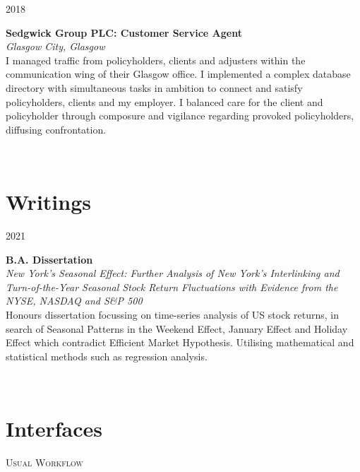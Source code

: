 \documentclass[a4, 10pt]{article}
\begin{document}
{\begin{minipage}[t]{.15\linewidth}
        \hfill    
        \textsc{2018}
\end{minipage}                    
\hfill\vline\hfill                
\begin{minipage}[t]{.80\linewidth}                
        \textbf{Sedgwick Group PLC: Customer Service Agent }\\ 
        \textit{Glasgow City, Glasgow}\\    
	I managed traffic from policyholders, clients and adjusters within the communication wing of their Glasgow office. I implemented a complex database directory with simultaneous tasks in ambition to connect and satisfy policyholders, clients and my employer. I balanced care for the client and policyholder through composure and vigilance regarding provoked policyholders, diffusing confrontation.
\end{minipage}\\
\vspace{0.25cm}


\section{Writings}

\begin{minipage}[t]{.15\linewidth}
        \hfill                  
        \textsc{2021}
\end{minipage}
\hfill\vline\hfill
\begin{minipage}[t]{.80\linewidth}
	\textbf{B.A. Dissertation}\\
	\textit{New York's Seasonal Effect: Further Analysis of New York's Interlinking and Turn-of-the-Year Seasonal Stock Return Fluctuations with Evidence from the NYSE, NASDAQ and S\&P 500}\\
	Honours dissertation focussing on time-series analysis of US stock returns, in search of Seasonal Patterns in the Weekend Effect, January Effect and Holiday Effect which contradict Efficient Market Hypothesis. Utilising mathematical and statistical methods such as regression analysis. 
\end{minipage}\\


\section{Interfaces}

\begin{center}
	\textsc{Usual Workflow}
\end{center}

}
\end{document}
